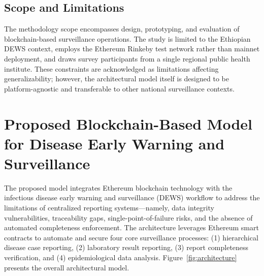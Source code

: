 \documentclass[AMA,LATO1COL]{WileyNJD-v2}
\begin{document}
\subsection{Scope and Limitations}\label{subsec:scope}

The methodology scope encompasses design, prototyping, and evaluation of blockchain-based surveillance operations. The study is limited to the Ethiopian DEWS context, employs the Ethereum Rinkeby test network rather than mainnet deployment, and draws survey participants from a single regional public health institute. These constraints are acknowledged as limitations affecting generalizability; however, the architectural model itself is designed to be platform-agnostic and transferable to other national surveillance contexts.

\section{Proposed Blockchain-Based Model for Disease Early Warning and Surveillance}\label{sec:model}

The proposed model integrates Ethereum blockchain technology with the infectious disease early warning and surveillance (DEWS) workflow to address the limitations of centralized reporting systems---namely, data integrity vulnerabilities, traceability gaps, single-point-of-failure risks, and the absence of automated completeness enforcement. The architecture leverages Ethereum smart contracts to automate and secure four core surveillance processes: (1) hierarchical disease case reporting, (2) laboratory result reporting, (3) report completeness verification, and (4) epidemiological data analysis. Figure~\ref{fig:architecture} presents the overall architectural model.
\end{document}
